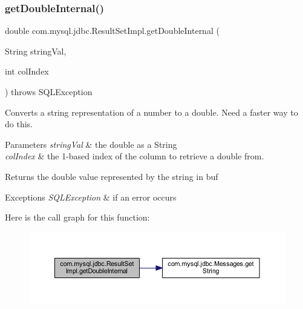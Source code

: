 \subsubsection{\texorpdfstring{get\+Double\+Internal()}{getDoubleInternal()}\hspace{0.1cm}{\footnotesize\ttfamily [2/2]}}
{\footnotesize\ttfamily double com.\+mysql.\+jdbc.\+Result\+Set\+Impl.\+get\+Double\+Internal (\begin{DoxyParamCaption}\item[{String}]{string\+Val,  }\item[{int}]{col\+Index }\end{DoxyParamCaption}) throws S\+Q\+L\+Exception\hspace{0.3cm}{\ttfamily [protected]}}

Converts a string representation of a number to a double. Need a faster way to do this.


\begin{DoxyParams}{Parameters}
{\em string\+Val} & the double as a String \\
\hline
{\em col\+Index} & the 1-\/based index of the column to retrieve a double from.\\
\hline
\end{DoxyParams}
\begin{DoxyReturn}{Returns}
the double value represented by the string in buf
\end{DoxyReturn}

\begin{DoxyExceptions}{Exceptions}
{\em S\+Q\+L\+Exception} & if an error occurs \\
\hline
\end{DoxyExceptions}
Here is the call graph for this function\+:
\nopagebreak
\begin{figure}[H]
\begin{center}
\leavevmode
\includegraphics[width=350pt]{classcom_1_1mysql_1_1jdbc_1_1_result_set_impl_afc961b03d47113ee8d5b329ec333ad3d_cgraph}
\end{center}
\end{figure}
\mbox{\label{classcom_1_1mysql_1_1jdbc_1_1_result_set_impl_a67b150f3cdb700ccb176c37b732cab17}} 

